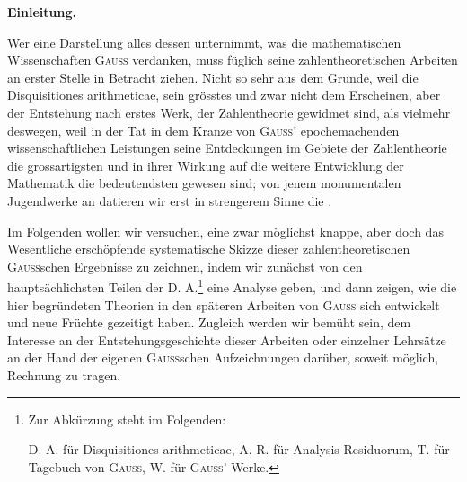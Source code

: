\clearpage\NoSourceHead{}
\begin{center}\large\bfseries Einleitung.\end{center}
\noindent\hspace*{\parindent}Wer eine Darstellung alles dessen unternimmt, was die mathematischen Wissenschaften \textsc{Gauss} verdanken, muss füglich seine zahlentheoretischen Arbeiten an erster Stelle in Betracht ziehen. Nicht so sehr aus dem Grunde, weil die Disquisitiones arithmeticae, sein grösstes und zwar nicht dem Erscheinen, aber der Entstehung nach erstes Werk, der Zahlentheorie gewidmet sind, als vielmehr deswegen, weil in der Tat in dem Kranze von \textsc{Gauss}’ epochemachenden wissenschaftlichen Leistungen seine Entdeckungen im Gebiete der Zahlentheorie die grossartigsten und in ihrer Wirkung auf die weitere Entwicklung der Mathematik die bedeutendsten gewesen sind; von jenem monumentalen Jugendwerke an datieren wir erst in strengerem Sinne die .

Im Folgenden wollen wir versuchen, eine zwar möglichst knappe, aber doch das Wesentliche erschöpfende systematische Skizze dieser zahlentheoretischen \textsc{Gauss}schen Ergebnisse zu zeichnen, indem wir zunächst von den hauptsächlichsten Teilen der D. A.\footnote{Zur Abkürzung steht im Folgenden:\par
D. A. für Disquisitiones arithmeticae, A. R. für Analysis Residuorum, T. für Tagebuch von \textsc{Gauss}, W. für \textsc{Gauss}’ Werke.} eine Analyse geben, und dann zeigen, wie die hier begründeten Theorien in den späteren Arbeiten von \textsc{Gauss} sich entwickelt und neue Früchte gezeitigt haben. Zugleich werden wir bemüht sein, dem Interesse an der Entstehungsgeschichte dieser Arbeiten oder einzelner Lehrsätze an der Hand der eigenen \textsc{Gauss}schen Aufzeichnungen darüber, soweit möglich, Rechnung zu tragen.
\clearpage
